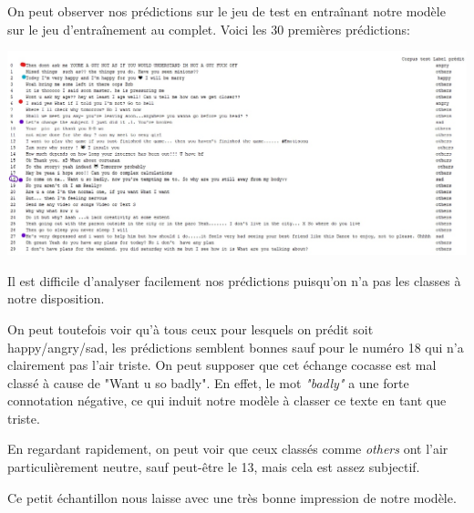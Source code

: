 On peut observer nos prédictions sur le jeu de test en entraînant notre modèle sur le jeu d'entraînement au complet. Voici les 30 premières prédictions:

\includegraphics[width=\linewidth,keepaspectratio]{images/couleur_predictions}

Il est difficile d'analyser facilement nos prédictions puisqu'on n'a pas les classes à notre disposition. 

On peut toutefois voir qu'à tous ceux pour lesquels on prédit soit happy/angry/sad, les prédictions semblent bonnes sauf pour le numéro 18 qui n'a clairement pas l'air triste. On peut supposer que cet échange cocasse est mal classé à cause de "Want u so badly". En effet, le mot \emph{"badly"} a une forte connotation négative, ce qui induit notre modèle à classer ce texte en tant que triste. 

En regardant rapidement, on peut voir que ceux classés comme \emph{others} ont l'air particulièrement neutre, sauf peut-être le 13, mais cela est assez subjectif.

Ce petit échantillon nous laisse avec une très bonne impression de notre modèle.